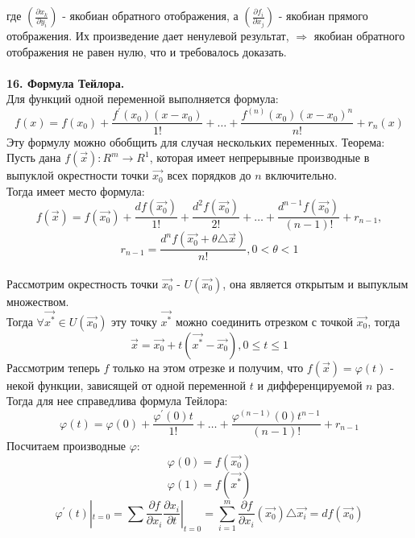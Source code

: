\documentclass[12pt]{article}
\begin{document}
где $(\frac{\partial x_k}{\partial y_i})$ - якобиан обратного отображения, а $(\frac{\partial f_i}{\partial x_j})$ - якобиан прямого отображения. Их произведение дает ненулевой результат, $\Rightarrow$ якобиан обратного отображения не равен нулю, что и требовалось доказать.\\
\\
\label{question16}\textbf{16. Формула Тейлора.}\\
Для функций одной переменной выполняется формула:\\
$$f(x) = f(x_0)+\frac{f^{'}(x_0)(x-x_0)}{1!}+\dots+\frac{f^{(n)}(x_0)(x-x_0)^{n}}{n!}+r_n(x)$$
Эту формулу можно обобщить для случая нескольких переменных. Теорема:\\
Пусть дана $f(\overrightarrow{x}) : R^m\to R^1$, которая имеет непрерывные производные в выпуклой окрестности точки $\overrightarrow{x_0}$ всех порядков до $n$ включительно.\\
Тогда имеет место формула:\\
$$f(\overrightarrow{x}) = f(\overrightarrow{x_0})+\frac{df(\overrightarrow{x_0})}{1!}+\frac{d^2 f(\overrightarrow{x_0})}{2!}+\dots+\frac{d^{n-1} f(\overrightarrow{x_0})}{(n-1)!}+r_{n-1},$$
$$r_{n-1}=\frac{d^n f(\overrightarrow{x_0}+\theta {\bigtriangleup \overrightarrow{x}})}{n!}, 0<\theta<1$$
\\
Рассмотрим окрестность точки $\overrightarrow{x_0}$ - $U(\overrightarrow{x_0})$, она является открытым и выпуклым множеством.\\
Тогда $\forall \overrightarrow{x^{*}} \in U(\overrightarrow{x_0})$ эту точку $\overrightarrow{x^{*}}$ можно соединить отрезком с точкой $\overrightarrow{x_0}$, тогда\\
$$\overrightarrow{x} = \overrightarrow{x_0}+t(\overrightarrow{x^{*}}-\overrightarrow{x_0}), 0\leq t\leq 1$$
Рассмотрим теперь $f$ только на этом отрезке и получим, что $f(\overrightarrow{x}) = \varphi (t)$ - некой функции, зависящей от одной переменной $t$ и дифференцируемой $n$ раз.\\
Тогда для нее справедлива формула Тейлора:\\
$$\varphi(t)=\varphi(0)+\frac{\varphi^{'}(0)t}{1!}+\dots+\frac{\varphi^{(n-1)}(0)t^{n-1}}{(n-1)!}+r_{n-1}$$
Посчитаем производные $\varphi$:\\
$$\varphi(0)=f(\overrightarrow{x_0})$$
$$\varphi(1)=f(\overrightarrow{x^{*}})$$
$$\varphi^{'}(t)|_{t=0}=\sum \frac{\partial f}{\partial x_i} \frac{\partial x_i}{\partial t}|_{t=0} = \sum_{i=1}^m \frac{\partial f}{\partial x_i}(\overrightarrow{x_0}){\bigtriangleup \overrightarrow{x_i}}=df(\overrightarrow{x_0})$$
\end{document}

